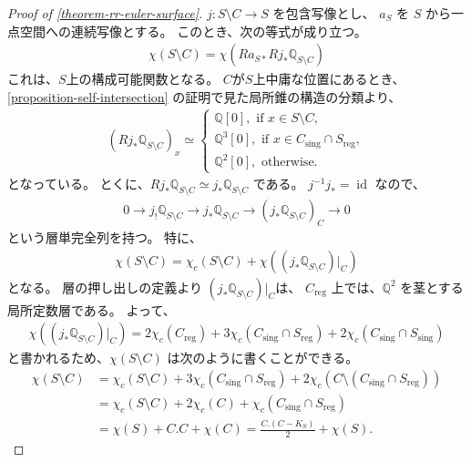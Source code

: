 \documentclass[a4paper,dvipdfmx,reqno,12pt]{amsart}
\theoremstyle{definition}
\newcommand{\opn}[1]{\operatorname{#1}}
\numberwithin{equation}{section}
\begin{document}
\begin{proof}[{Proof of \cref{theorem-rr-euler-surface}}]

$j\colon S\setminus C\to S$ を包含写像とし、
$a_S$ を $S$ から一点空間への連続写像とする。
このとき、次の等式が成り立つ。
\begin{align}
\chi(S\setminus C)=\chi(Ra_{S*}Rj_*\mathbb{Q}_{S\setminus C}) 
\end{align}
これは、$S$上の構成可能関数となる。
$C$が$S$上中庸な位置にあるとき、
\cref{proposition-self-intersection}
の証明で見た局所錐の構造の分類より、
\begin{align}
(Rj_*\mathbb{Q}_{S\setminus C})_x
\simeq
\begin{cases}
\mathbb{Q}[0], \text{ if } x\in S\setminus C, \\
\mathbb{Q}^3[0], \text{ if } x\in C_{\mathrm{sing}}
\cap S_{\mathrm{reg}}, \\
\mathbb{Q}^2[0], \text{ otherwise.}  
\end{cases}  
\end{align}
となっている。
とくに、$Rj_*\mathbb{Q}_{S\setminus C}\simeq
j_*\mathbb{Q}_{S\setminus C}$ である。
$j^{-1}j_*=\opn{id}$ なので、
\begin{align}
0\to j_!\mathbb{Q}_{S\setminus C} 
\to j_* \mathbb{Q}_{S\setminus C}
\to (j_*\mathbb{Q}_{S\setminus C})_{C} \to 0
\end{align}
という層単完全列を持つ。
特に、
\begin{align}
\chi(S\setminus C)=
\chi_c(S\setminus C)+\chi((j_*\mathbb{Q}_{S\setminus C})|_C)
\end{align}
となる。
層の押し出しの定義より
$(j_*\mathbb{Q}_{S\setminus C})|_C$は、
$C_{\opn{reg}}$ 上では、$\mathbb{Q}^2$
を茎とする局所定数層である。
よって、
\begin{align}
\chi((j_*\mathbb{Q}_{S\setminus C})|_C)=
2\chi_c(C_{\mathrm{reg}})+
3\chi_c(C_{\mathrm{sing}}\cap S_{\mathrm{reg}})+
2\chi_c(C_{\mathrm{sing}}\cap S_{\mathrm{sing}})
\end{align}
と書かれるため、$\chi(S\setminus C)$
は次のように書くことができる。
\begin{align}
\label{equation-euler-calculus}
\chi(S\setminus C)&=
\chi_c(S\setminus C)+
3\chi_c(C_{\mathrm{sing}}
\cap S_{\mathrm{reg}})+
2\chi_c(C\setminus (C_{\mathrm{sing}}
\cap S_{\mathrm{reg}}))\\
&=\chi_c(S\setminus C)+2\chi_c(C)+
\chi_c(C_{\mathrm{sing}}
\cap S_{\mathrm{reg}}) \\
&=\chi(S)+C.C+\chi(C)
=\frac{C.(C-K_S)}{2}+\chi(S).
\end{align}
\end{proof}
\end{document}
